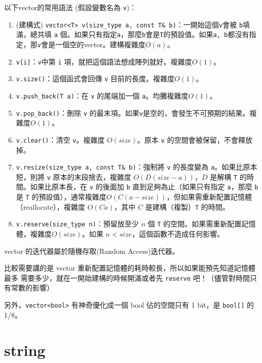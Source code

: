 \documentclass[a4paper, 11pt, oneside]{book}
\begin{document}
以下vector的常用語法 (假設變數名為 \texttt{v})：

\begin{enumerate}
    \item (建構式) \texttt{vector<T> v(size\_type a, const T\& b)}：一開始這個\texttt{v}會被 \texttt{b}填滿，總共填 \texttt{a} 個。如果只有指定\texttt{a}，那麼\texttt{b}會是\texttt{T}的預設值。如果\texttt{a, b}都沒有指定，那\texttt{v}會是一個空的vector。建構複雜度$O(a)$。
    \item \texttt{v[i]}：\texttt{v}中第 \texttt{i} 項，就把這個語法想成陣列就好。複雜度$O(1)$。
    \item \texttt{v.size()}：這個函式會回傳 \texttt{v} 目前的長度。複雜度$O(1)$。
    \item \texttt{v.push\_back(T a)}：在 \texttt{v} 的尾端加一個 \texttt{a}。均攤複雜度$O(1)$。
    \item \texttt{v.pop\_back()}：刪除 \texttt{v} 的最末項。如果\texttt{v}是空的，會發生不可預期的結果。複雜度$O(1)$。
    \item \texttt{v.clear()}：清空 \texttt{v}。複雜度 $O(size)$。原本 \texttt{v} 的空間會被保留，不會釋放掉。
    \item \texttt{v.resize(size\_type a, const T\& b)}：強制將 \texttt{v} 的長度變為 \texttt{a}。如果比原本短，則將 \texttt{v} 原本的末段捨去，複雜度 $O(D(size − a))$，$D$ 是解構 \texttt{T} 的時間。如果比原本長，在 \texttt{v} 的後面加 \texttt{b} 直到足夠為止（如果只有指定 \texttt{a}，那麼 \texttt{b} 是 \texttt{T} 的預設值），通常複雜度$O(C(a − size))$，但如果需重新配置記憶體（reallocate），複雜度 $O(Ca)$，其中 $C$ 是建構（複製）\texttt{T} 的時間。
    \item \texttt{v.reserve(size\_type n)}：預留放至少 $n$ 個 \texttt{T} 的空間。如果需重新配置記憶體，複雜度$O(size)$。如果 $n < size$，這個函數不造成任何影響。
\end{enumerate}

vector 的迭代器屬於隨機存取(Random Access)迭代器。

比較需要講的是 vector 重新配置記憶體的耗時較長，所以如果能預先知道記憶體最多
需要多少，就在一開始建構的時候開滿或者先 \texttt{reserve} 吧！（儘管對時間只有常數的影響）

另外，\texttt{vector<bool>} 有神奇優化成一個 bool 佔的空間只有 1 bit，是 \texttt{bool[]} 的 1/8。

\section{string}
\end{document}
